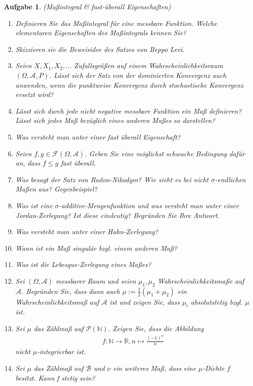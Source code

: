 \documentclass[11pt, a4paper, ngerman]{article}
\newcommand{\N}{\mathbb{N}}
\newcommand{\R}{\mathbb{R}}
\newtheorem{aufgabe}{Aufgabe}
\begin{document}
\begin{aufgabe} (Maßintegral \& fast-überall Eigenschaften)
    \begin{enumerate}
        \item 
        Definieren Sie das Maßintegral für eine messbare Funktion. Welche elementaren Eigenschaften des Maßintegrals kennen Sie?  
        \item
        Skizzieren sie die Beweisidee des Satzes von Beppo Levi. 
        \item 
        Seien $X, X_1, X_2,...$ Zufallsgrößen auf einem Wahrscheinlichkeitsraum $(\Omega, \mathcal{A},P)$. Lässt sich der Satz von der dominierten Konvergenz auch anwenden, wenn die punktweise Konvergenz durch stochastische Konvergenz ersetzt wird? 
        \item 
        Lässt sich durch jede nicht negative messbare Funktion ein Maß definieren? Lässt sich jedes Maß bezüglich eines anderen Maßes so darstellen?
        \item 
        Was versteht man unter einer fast überall Eigenschaft?
        \item 
        Seien $f,g \in \mathcal{F}(\Omega, \mathcal{A})$. Geben Sie eine möglichst schwache Bedingung dafür an, dass $f \leq g$ fast überall.
        \item 
        Was besagt der Satz von Radon-Nikodym? Wie sieht es bei nicht $\sigma$-endlichen Maßen aus? Gegenbeispiel?
        \item 
        Was ist eine $\sigma$-additive-Mengenfunktion und was versteht man unter einer Jordan-Zerlegung? Ist diese eindeutig? Begründen Sie Ihre Antwort. 
        \item 
        Was versteht man unter einer Hahn-Zerlegung?
        \item 
        Wann ist ein Maß singulär bzgl. einem anderen Maß? 
        \item 
        Was ist die Lebesgue-Zerlegung eines Maßes?
        \item 
        Sei $(\Omega, \mathcal{A})$ messbarer Raum und seien $\mu_1, \mu_2$ Wahrscheinlichkeitsmaße auf $\mathcal{A}$. Begründen Sie, dass dann auch $\mu := \frac{1}{2}(\mu_1 + \mu_2)$
        ein Wahrscheinlichkeitsmaß auf $\mathcal{A}$ ist und zeigen Sie, dass $\mu_i$ absolutstetig bzgl. $\mu$ ist. 
        \item 
        Sei $\mu$ das Zählmaß auf $\mathcal{P}(\N)$. Zeigen Sie, dass die Abbildung
        \begin{align*}
            f: \N \to \R, n \mapsto \frac{(-1)^n}{n}
        \end{align*}
        nicht $\mu$-integrierbar ist. 
        \item
        Sei $\mu$ das Zählmaß auf $\mathcal{B}$ und $\nu$ ein weiteres Maß, dass eine $\mu$-Dichte $f$ besitzt. Kann f stetig sein? 

    
    \end{enumerate}
\end{aufgabe}
\end{document}
